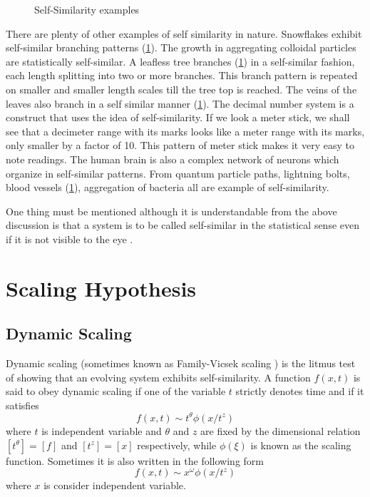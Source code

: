 \begin{figure}
		\caption{Self-Similarity examples}
		\label{fig:example-self-similarity}
	\end{figure}


	There are plenty of other examples of self similarity in nature. Snowflakes exhibit self-similar branching patterns (\ref{fig:example-self-similarity}). The growth in aggregating colloidal particles are statistically self-similar. A leafless tree branches (\ref{fig:example-self-similarity}) in a self-similar fashion, each length splitting into two or more branches. This branch pattern is repeated on smaller and smaller length scales till the tree top is reached. The veins of the leaves also branch in a self similar manner (\ref{fig:example-self-similarity}). The decimal number system is a construct that uses the idea of self-similarity. If we look a meter stick, we shall see that a decimeter range with its marks looks like a meter range with its marks, only smaller by a factor of 10. This pattern of meter stick makes it very easy to note readings. The human brain is also a complex network of neurons which organize in self-similar patterns. From quantum particle paths, lightning bolts, blood vessels (\ref{fig:example-self-similarity}), aggregation of bacteria all are example of self-similarity.
	
	One thing must be mentioned although it is understandable from the above discussion is that a system is to be called self-similar in the statistical sense even if it is not visible to the eye \cite{Mandelbrot1967}.
	
	
	
\section{Scaling Hypothesis}
	\subsection{Dynamic Scaling}
	Dynamic scaling (sometimes known as Family-Vicsek scaling \cite{Family1985, Vicsek1984}) is the litmus test of showing that an evolving system exhibits self-similarity.	A function $f(x,t)$ is said to obey dynamic scaling if one of the variable $t$ strictly denotes time and if it satisfies
	\begin{equation}
		f(x,t) \sim t^\theta \phi(x/t^z)
		\label{dynamic scaling definition}
	\end{equation}
	where $t$ is independent variable and $\theta$ and $z$ are fixed by the dimensional relation $\left[t^\theta\right] = \left[f\right]$ and $\left[t^z\right] = \left[x\right]$ respectively, while $\phi(\xi)$ is known as the scaling function. Sometimes it is also written in the following form
	\begin{equation}
	f(x,t) \sim x^\omega \phi(x/t^z)
	\label{dynamic scaling definition 2}
	\end{equation}
	where $x$ is consider independent variable.
	
